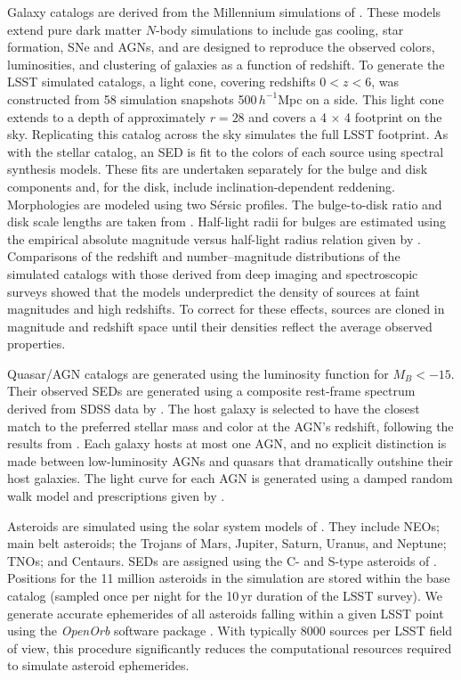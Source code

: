 Galaxy catalogs are derived from the Millennium simulations of
\citet{2006MNRAS.366..499D}.  These models extend pure dark matter $N$-body
simulations to include gas cooling, star formation, SNe and
AGNs, and are designed to reproduce the observed colors, luminosities,
and clustering of galaxies as a function of redshift. To generate the
LSST simulated catalogs, a light cone, covering redshifts $0<z<6$, was
constructed from 58 simulation snapshots 500\,$h^{-1}$Mpc on a side. This
light cone extends to a depth of approximately $r=28$ and covers a
4$\,\times\,$4 footprint on the sky. Replicating this
catalog across the sky simulates the full LSST footprint. As with the
stellar catalog, an SED is fit to the colors of each source using
\citet{2003MNRAS.344.1000B} spectral synthesis models. These fits are
undertaken separately for the bulge and disk components and, for the
disk, include inclination-dependent reddening. Morphologies are
modeled using two S\'ersic profiles. The bulge-to-disk ratio and disk
scale lengths are taken from \citet{2006MNRAS.366..499D}. Half-light radii
for bulges are estimated using the empirical absolute magnitude
versus half-light radius relation given by \citet{2009MNRAS.397.1254G}.
Comparisons of the redshift and number--magnitude
distributions of the simulated catalogs with those derived from deep
imaging and spectroscopic surveys showed that the \citet{2006MNRAS.366..499D}
models underpredict the density of sources at faint magnitudes
and high redshifts. To correct for these effects, sources are cloned
in magnitude and redshift space until their densities reflect the
average observed properties.

Quasar/AGN catalogs are generated using the \citet{2007A&A...472..443B}
luminosity function for $M_B < -15$.
Their observed SEDs are generated using a composite
rest-frame spectrum derived from SDSS data by \citet{2001AJ....122..549V}.
The host galaxy is selected to have the closest match to
the preferred stellar mass and color at the AGN's redshift, following
the results from \citet{2010ApJ...720..368X}.  Each galaxy hosts at most one
AGN, and no explicit distinction is made between low-luminosity AGNs and
quasars that dramatically outshine their host galaxies. The light
curve for each AGN is generated using a damped random walk model and
prescriptions given by \citet{2010ApJ...721.1014M}.

Asteroids are simulated using the solar system models of \citet{2007AAS...211.4721G}.
They include NEOs; main belt
asteroids; the Trojans of Mars, Jupiter, Saturn, Uranus, and Neptune;
TNOs; and Centaurs. SEDs
are assigned using the C- and S-type asteroids of \citet{2009Icar..202..160D}.
Positions for the 11 million asteroids in the simulation
are stored within the base catalog (sampled once per night for the
10\,yr duration of the LSST survey). We generate
accurate ephemerides of all asteroids falling within a given LSST
point using the \textit{OpenOrb} software package \citep{2009M&PS...44.1853G}.
With typically 8000 sources per LSST field of view, this
procedure significantly reduces the computational resources
required to simulate asteroid ephemerides.



